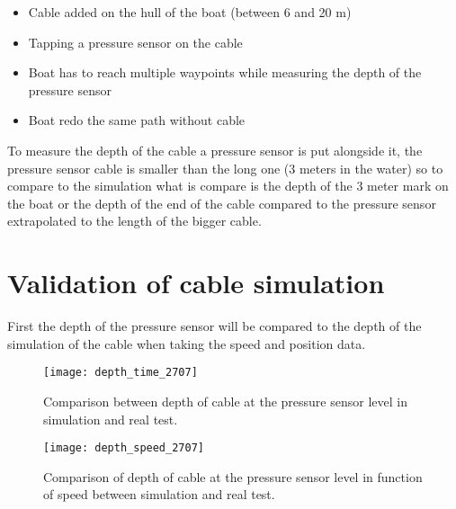 \begin{itemize}
\item Cable added on the hull of the boat (between 6 and 20 m)
\item Tapping a pressure sensor on the cable
\item Boat has to reach multiple waypoints while measuring the depth of the pressure sensor
\item Boat redo the same path without cable
\end{itemize}

To measure the depth of the cable a pressure sensor is put alongside it, the pressure sensor cable is smaller than 
the long one (3 meters in the water) so to compare to the simulation what is compare is the depth of the 3 meter mark on the boat or the depth of the end of the cable compared to the pressure sensor extrapolated to the length of the bigger cable.

\section{Validation of cable simulation}

First the depth of the pressure sensor will be compared to the depth of the simulation of the cable when taking the speed and position data.

\begin{figure}[H]
\centering
    \begin{minipage}[b]{0.4\textwidth}
    \centering
    \texttt{[image: depth\_time\_2707]}
    \caption{Comparison between depth of cable at the pressure sensor level in simulation and real test.}
    \label{fig:comp_depth_time_2007}
    \end{minipage}
    \hfill
    \begin{minipage}[b]{0.45\textwidth}
    \centering
    \texttt{[image: depth\_speed\_2707]}
    \caption{Comparison of depth of cable at the pressure sensor level in function of speed between simulation and real test.}
    \label{fig:comp_depth_speed_2007}
    \end{minipage}
\end{figure}
